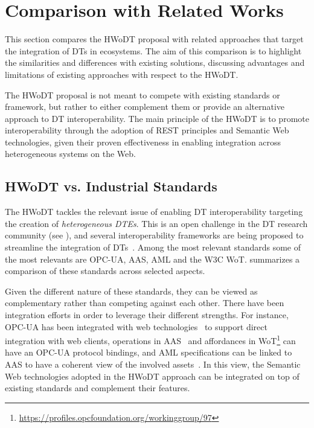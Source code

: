 \section{Comparison with Related Works}
\label{sec:dte:hwodt:related}

This section compares the \ac{HWoDT} proposal with related approaches that target the integration of \acp{DT} in ecosystems. 
%
The aim of this comparison is to highlight the similarities and differences with existing solutions, discussing advantages and limitations of existing approaches with respect to the \ac{HWoDT}.

The \ac{HWoDT} proposal is not meant to compete with existing standards or framework, but rather to either complement them or provide an alternative approach to \ac{DT} interoperability.
%
The main principle of the \ac{HWoDT} is to promote interoperability through the adoption of \ac{REST} principles and Semantic Web technologies, given their proven effectiveness in enabling integration across heterogeneous systems on the Web.


\subsection{HWoDT vs. Industrial Standards}

The \ac{HWoDT} tackles the relevant issue of enabling \ac{DT} interoperability targeting the creation of \emph{heterogeneous \acp{DTE}}.
%
This is an open challenge in the \ac{DT} research community (see ), and several interoperability frameworks are being proposed to streamline the integration of \acp{DT}~\cite{Barnard_2024}.
%
Among the most relevant standards some of the most relevants are \ac{OPC-UA}, \ac{AAS}, \ac{AML} and the \ac{W3C} \ac{WoT}.  summarizes a comparison of these standards across selected aspects.

Given the different nature of these standards, they can be viewed as complementary rather than competing against each other.
%
There have been integration efforts in order to leverage their different strengths. For instance, \ac{OPC-UA} has been integrated with web technologies~\cite{DBLP:journals/csi/CavalieriSS19} to support direct integration with web clients, operations in \ac{AAS}~\cite{platform_i40_aas_part1_v2} and affordances in \ac{WoT}\footnote{\url{https://profiles.opcfoundation.org/workinggroup/97}} can have an \ac{OPC-UA} protocol bindings, and \ac{AML} specifications can be linked to \ac{AAS} to have a coherent view of the involved assets~\cite{DBLP:conf/etfa/DrathRH19,DBLP:conf/indin/WengerZ018}.
%
In this view, the Semantic Web technologies adopted in the \ac{HWoDT} approach can be integrated on top of existing standards and complement their features.

